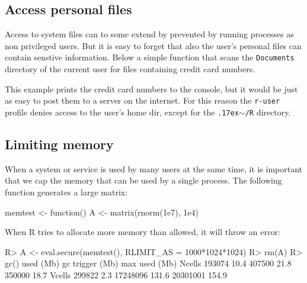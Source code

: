 \documentclass{jss}
\newcommand{\R}{\textsf{R}\xspace}
\begin{document}
\begin{appendices}
\subsection{Access personal files}
\label{creditcard}

Access to system files can to some extend by prevented by running processes as
non privileged users. But it is easy to forget that also the user's personal
files can contain senstive information. Below a simple function that scans the
\texttt{Documents} directory of the current user for files containing credit
card numbers.

\begin{CodeChunk}
\end{CodeChunk}

This example prints the credit card numbers to the console, but it would be just as
easy to post them to a server on the internet. For this reason the
\texttt{r-user} profile denies access to the user's home dir, except for the
\texttt{{\raise.17ex\hbox{$\scriptstyle\sim$}}/R} directory.


\subsection{Limiting memory}

When a system or service is used by many users at the same time, it is important
that we cap the memory that can be used by a single process. The following
function generates a large matrix:

\begin{CodeChunk}
\begin{CodeInput}
memtest <- function(){
	A <- matrix(rnorm(1e7), 1e4)
}
\end{CodeInput}
\end{CodeChunk}

When \R tries to allocate more memory than allowed, it will throw an error:

\begin{CodeChunk}
\begin{CodeInput}
R> A <- eval.secure(memtest(), RLIMIT_AS = 1000*1024*1024)
R> rm(A)
R> gc()
         used (Mb) gc trigger  (Mb) max used  (Mb)
Ncells 193074 10.4     407500  21.8   350000  18.7
Vcells 299822  2.3   17248096 131.6 20301001 154.9


\end{CodeInput}
\end{CodeChunk}
\end{appendices}
\end{document}
